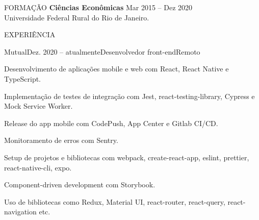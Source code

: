 \documentclass{resume}
\begin{document}

\begin{rSection}{FORMAÇÃO}
  {\bf Ciências Econômicas} \hfill {Mar 2015 -- Dez  2020}
  \\
  Universidade Federal Rural do Rio de Janeiro.
  \\
\end{rSection}


\begin{rSection}{EXPERIÊNCIA}
  \begin{rSubsection}{Mutual}{Dez. 2020 -- atualmente}{Desenvolvedor
    front-end}{Remoto}
  \item Desenvolvimento de aplicações mobile e web com React, React Native e
    TypeScript.
  \item Implementação de testes de integração com Jest, react-testing-library,
    Cypress e Mock Service Worker.
  \item Release do app mobile com CodePush, App Center e Gitlab CI/CD.
  \item Monitoramento de erros com Sentry.
  \item Setup de projetos e bibliotecas com webpack, create-react-app, eslint,
    prettier, react-native-cli, expo.
  \item Component-driven development com Storybook.
  \item Uso de bibliotecas como Redux, Material UI, react-router, react-query,
    react-navigation etc.
  \vspace{5mm}
  \end{rSubsection}
\end{rSection}

\end{document}
